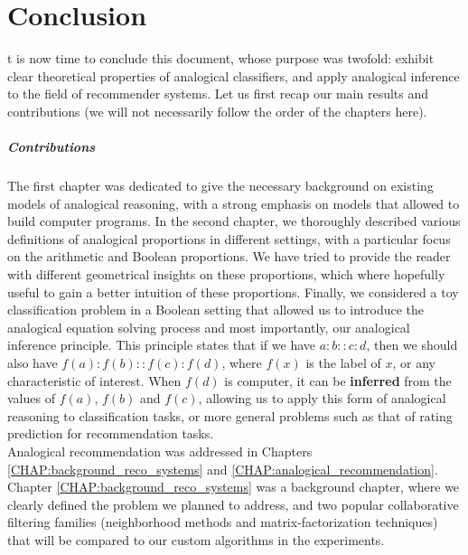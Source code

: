 \chapter*{Conclusion}

t is now time to conclude this document, whose purpose was twofold:
exhibit clear theoretical properties of analogical classifiers, and apply
analogical inference to the field of recommender systems. Let us first recap
our main results and contributions (we will not necessarily follow the order of
the chapters here).

\paragraph{Contributions\\}

The first chapter was dedicated to give the necessary background on existing
models of analogical reasoning,  with a strong emphasis on models that allowed
to build computer programs. In the second chapter, we thoroughly described
various definitions of analogical proportions in different settings, with a
particular focus on the arithmetic and Boolean proportions. We have tried to
provide the reader with different geometrical insights on these proportions,
which where hopefully useful to gain a better intuition of these proportions.
Finally, we considered a toy classification problem in a Boolean setting that
allowed us to introduce the analogical equation solving process and most
importantly, our analogical inference principle. This principle states that if
we have $a:b::c:d$, then we should also have $f(a) : f(b) :: f(c):f(d)$, where
$f(x)$ is the label of $x$, or any characteristic of interest.  When $f(d)$ is
computer, it can be \textbf{inferred} from the values of $f(a)$, $f(b)$ and
$f(c)$, allowing us to apply this form of analogical reasoning to
classification tasks, or more general problems such as that of rating
prediction for recommendation tasks.\\

Analogical recommendation was addressed in Chapters
\ref{CHAP:background_reco_systems} and \ref{CHAP:analogical_recommendation}.
Chapter \ref{CHAP:background_reco_systems} was a background chapter, where we
clearly defined the problem we planned to address, and two popular
collaborative filtering families (neighborhood methods and
matrix-factorization techniques) that will be compared to our custom algorithms
in the experiments.

